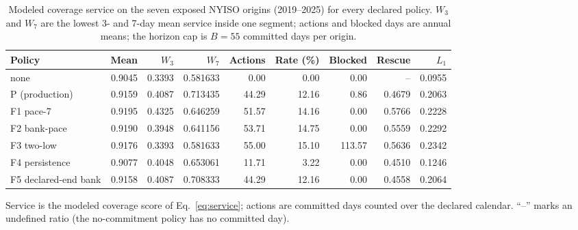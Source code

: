 \begin{table}[!tbp]
\centering
\caption{Modeled coverage service on the seven exposed NYISO origins (2019--2025) for every declared policy. $W_3$ and $W_7$ are the lowest 3- and 7-day mean service inside one segment; actions and blocked days are annual means; the horizon cap is $B=55$ committed days per origin.}
\label{tab:r2-service}
\scriptsize
\setlength{\tabcolsep}{3pt}
\begin{tabular}{@{}lrrrrrrrr@{}}
\toprule
Policy & Mean & $W_3$ & $W_7$ & Actions & Rate (\%) & Blocked & Rescue & $L_1$ \\
\midrule
none & 0.9045 & 0.3393 & 0.581633 & 0.00 & 0.00 & 0.00 & -- & 0.0955 \\
P (production) & 0.9159 & 0.4087 & 0.713435 & 44.29 & 12.16 & 0.86 & 0.4679 & 0.2063 \\
F1 pace-7 & 0.9195 & 0.4325 & 0.646259 & 51.57 & 14.16 & 0.00 & 0.5766 & 0.2228 \\
F2 bank-pace & 0.9190 & 0.3948 & 0.641156 & 53.71 & 14.75 & 0.00 & 0.5559 & 0.2292 \\
F3 two-low & 0.9176 & 0.3393 & 0.581633 & 55.00 & 15.10 & 113.57 & 0.5636 & 0.2342 \\
F4 persistence & 0.9077 & 0.4048 & 0.653061 & 11.71 & 3.22 & 0.00 & 0.4510 & 0.1246 \\
F5 declared-end bank & 0.9158 & 0.4087 & 0.708333 & 44.29 & 12.16 & 0.00 & 0.4558 & 0.2064 \\
\bottomrule
\end{tabular}
\par\footnotesize Service is the modeled coverage score of Eq.~\eqref{eq:service}; actions are committed days counted over the declared calendar. ``--'' marks an undefined ratio (the no-commitment policy has no committed day).
\end{table}
